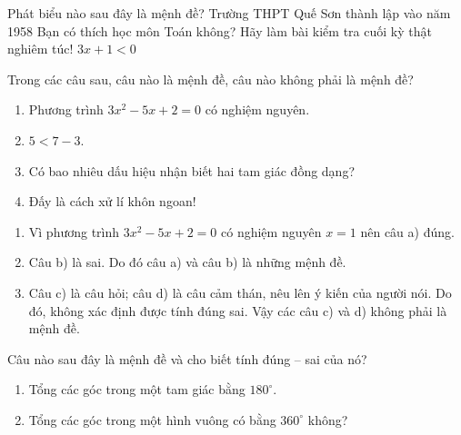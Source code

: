 \begin{ex}%
	Phát biểu nào sau đây là mệnh đề?
	\choice
	{\True Trường THPT Quế Sơn thành lập vào năm 1958}
	{Bạn có thích học môn Toán không?}
	{Hãy làm bài kiểm tra cuối kỳ thật nghiêm túc!}
	{$3x+1<0$}
\end{ex}

\begin{bt}[Mức độ 1]%
	Trong các câu sau, câu nào là mệnh đề, câu nào không phải là mệnh đề?
	\begin{enumerate}
		\item Phương trình $3x^2-5x+2=0$ có nghiệm nguyên.
		\item $5<7-3$.
		\item Có bao nhiêu dấu hiệu nhận biết hai tam giác đồng dạng?
		\item Đấy là cách xử lí khôn ngoan!
	\end{enumerate}
	\loigiai
	{\begin{enumerate}
			\item Vì phương trình $3x^2-5x+2=0$ có nghiệm nguyên $x=1$ nên câu a) đúng.
			\item Câu b) là sai. Do đó câu a) và câu b) là những mệnh đề.
			\item Câu c) là câu hỏi; câu d) là câu cảm thán, nêu lên ý kiến của người nói. Do đó, không xác định được tính đúng sai. Vậy các câu c) và d) không phải là mệnh đề.
	\end{enumerate}}
\end{bt}

\begin{bt}[Mức độ 1]%
	Câu nào sau đây là mệnh đề và cho biết tính đúng – sai của nó?
	\begin{enumerate}
		\item Tổng các góc trong một tam giác bằng $180^\circ$.
		\item Tổng các góc trong một hình vuông có bằng $360^\circ$ không?
	\end{enumerate}
\end{bt}

